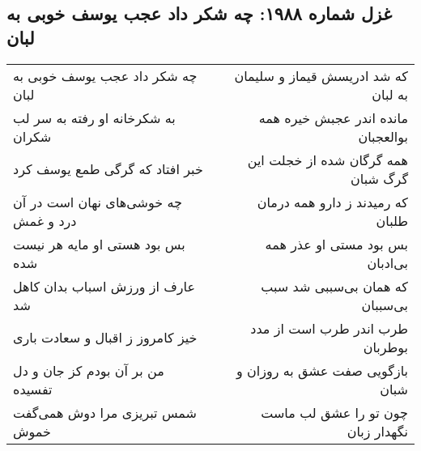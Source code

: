 \begin{center}
\section*{غزل شماره ۱۹۸۸: چه شکر داد عجب یوسف خوبی به لبان}
\label{sec:1988}
\begin{longtable}{l p{0.5cm} r}
چه شکر داد عجب یوسف خوبی به لبان
&&
که شد ادریسش قیماز و سلیمان به لبان
\\
به شکرخانه او رفته به سر لب شکران
&&
مانده اندر عجبش خیره همه بوالعجبان
\\
خبر افتاد که گرگی طمع یوسف کرد
&&
همه گرگان شده از خجلت این گرگ شبان
\\
چه خوشی‌های نهان است در آن درد و غمش
&&
که رمیدند ز دارو همه درمان طلبان
\\
بس بود هستی او مایه هر نیست شده
&&
بس بود مستی او عذر همه بی‌ادبان
\\
عارف از ورزش اسباب بدان کاهل شد
&&
که همان بی‌سببی شد سبب بی‌سببان
\\
خیز کامروز ز اقبال و سعادت باری
&&
طرب اندر طرب است از مدد بوطربان
\\
من بر آن بودم کز جان و دل تفسیده
&&
بازگویی صفت عشق به روزان و شبان
\\
شمس تبریزی مرا دوش همی‌گفت خموش
&&
چون تو را عشق لب ماست نگهدار زبان
\\
\end{longtable}
\end{center}
